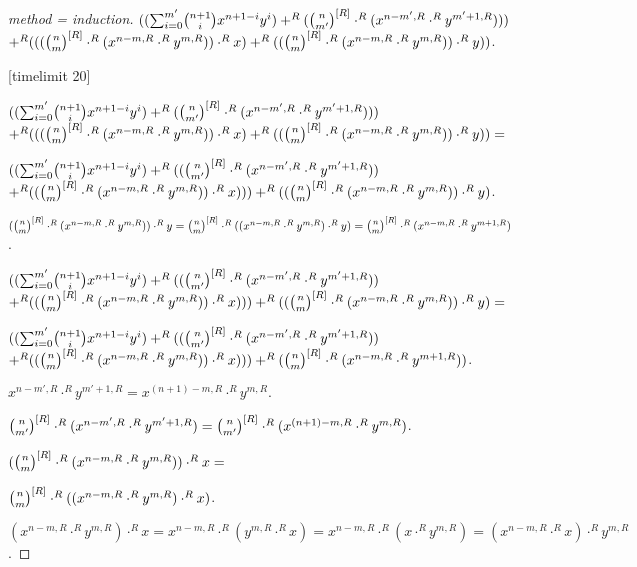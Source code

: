 \documentclass[11pt]{article}
\begin{document}
\begin{forthel}
\begin{proof}[method = induction]
$ ((\binsum{m'}{n+1}{x}{y}{R}) +^{R} (\cho{n}{m'}^{[R]} \cdot^{R} (x^{n-m',R} \cdot^{R} y^{m'+1,R}))) $
$ +^{R} 
(((\cho{n}{m}^{[R]} \cdot^{R} (x^{n - m,R} \cdot^{R} y^{m,R})) \cdot^{R} x)
   +^{R} ((\cho{n}{m}^{[R]} \cdot^{R} (x^{n - m,R} \cdot^{R} y^{m,R})) \cdot^{R} y)) $.

[timelimit 20]

$ ((\binsum{m'}{n+1}{x}{y}{R}) +^{R} (\cho{n}{m'}^{[R]} \cdot^{R} (x^{n-m',R} \cdot^{R} y^{m'+1,R}))) $
$ +^{R} 
(((\cho{n}{m}^{[R]} \cdot^{R} (x^{n - m,R} \cdot^{R} y^{m,R})) \cdot^{R} x)
   +^{R} ((\cho{n}{m}^{[R]} \cdot^{R} (x^{n - m,R} \cdot^{R} y^{m,R})) \cdot^{R} y)) =$

$ ((\binsum{m'}{n+1}{x}{y}{R}) +^{R} ((\cho{n}{m'}^{[R]} \cdot^{R} (x^{n-m',R} \cdot^{R} y^{m'+1,R})) $
$ +^{R} 
((\cho{n}{m}^{[R]} \cdot^{R} (x^{n - m,R} \cdot^{R} y^{m,R})) \cdot^{R} x)))
   +^{R} ((\cho{n}{m}^{[R]} \cdot^{R} (x^{n - m,R} \cdot^{R} y^{m,R})) \cdot^{R} y) $.

$(\cho{n}{m}^{[R]} \cdot^{R} (x^{n - m,R} \cdot^{R} y^{m,R})) \cdot^{R} y =
\cho{n}{m}^{[R]} \cdot^{R} ((x^{n - m,R} \cdot^{R} y^{m,R}) \cdot^{R} y) =
\cho{n}{m}^{[R]} \cdot^{R} (x^{n - m,R} \cdot^{R} y^{m+1,R})$.


$ ((\binsum{m'}{n+1}{x}{y}{R}) +^{R} ((\cho{n}{m'}^{[R]} \cdot^{R} (x^{n-m',R} \cdot^{R} y^{m'+1,R})) $
$ +^{R} 
((\cho{n}{m}^{[R]} \cdot^{R} (x^{n - m,R} \cdot^{R} y^{m,R})) \cdot^{R} x)))
   +^{R} ((\cho{n}{m}^{[R]} \cdot^{R} (x^{n - m,R} \cdot^{R} y^{m,R})) \cdot^{R} y) =$

$ ((\binsum{m'}{n+1}{x}{y}{R}) +^{R} ((\cho{n}{m'}^{[R]} \cdot^{R} (x^{n-m',R} \cdot^{R} y^{m'+1,R})) $
$ +^{R} 
((\cho{n}{m}^{[R]} \cdot^{R} (x^{n - m,R} \cdot^{R} y^{m,R})) \cdot^{R} x)))
   +^{R} (\cho{n}{m}^{[R]} \cdot^{R} (x^{n - m,R} \cdot^{R} y^{m+1,R})) $.

$x^{n-m',R} \cdot^{R} y^{m'+1,R} = x^{(n+1)-m,R} \cdot^{R} y^{m,R}.$

$\cho{n}{m'}^{[R]} \cdot^{R} (x^{n-m',R} \cdot^{R} y^{m'+1,R}) = 
\cho{n}{m'}^{[R]} \cdot^{R} (x^{(n+1)-m,R} \cdot^{R} y^{m,R})$.

$(\cho{n}{m}^{[R]} \cdot^{R} (x^{n - m,R} \cdot^{R} y^{m,R})) \cdot^{R} x = $

$\cho{n}{m}^{[R]} \cdot^{R} ((x^{n - m,R} \cdot^{R} y^{m,R}) \cdot^{R} x)$.

$(x^{n - m,R} \cdot^{R} y^{m,R}) \cdot^{R} x = 
x^{n - m,R} \cdot^{R} (y^{m,R} \cdot^{R} x) =
x^{n - m,R} \cdot^{R} (x \cdot^{R} y^{m,R}) =
(x^{n - m,R} \cdot^{R} x) \cdot^{R} y^{m,R}$.


\end{proof}
\end{forthel}
\end{document}
